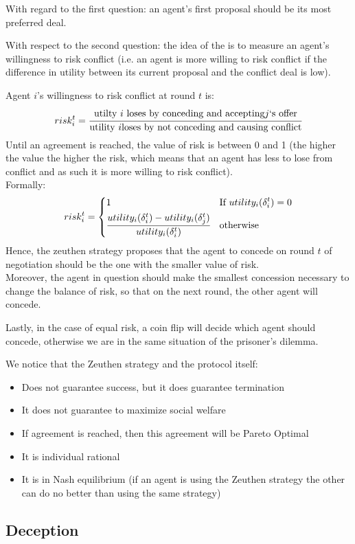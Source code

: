 With regard to the first question: an agent's first proposal should be its most preferred deal.

With respect to the second question: the idea of the  is to measure an agent's willingness to risk conflict (i.e. an agent is more willing to risk conflict if the difference in utility between its current proposal and the conflict deal is low).

Agent $i$'s willingness to risk conflict at round $t$ is:
\[risk^t_i = \cfrac{\text{utilty }i\text{ loses by conceding and accepting}j\text{`s offer} }{\text{utility }i\text{loses by not conceding and causing conflict}}\]
Until an agreement is reached, the value of risk is between 0 and 1 (the higher the value the higher the risk, which means that an agent has less to lose from conflict and as such it is more willing to risk conflict).\\
Formally:
\[risk^t_i =
\begin{dcases}
1 & \text{If }utility_i(\delta_i^t)=0\\
\cfrac{utility_i(\delta_i^t) - utility_i(\delta_j^t)}{utility_i(\delta_i^t)} &\text{otherwise}
\end{dcases}
\]
Hence, the zeuthen strategy proposes that the agent to concede on round $t$ of negotiation should be the one with the smaller value of risk.\\
Moreover, the agent in question should make the smallest concession necessary to change the balance of risk, so that on the next round, the other agent will concede.

Lastly, in the case of equal risk, a coin flip will decide which agent should concede, otherwise we are in the same situation of the prisoner's dilemma.

We notice that the Zeuthen strategy and the protocol itself:
\begin{itemize}
\item Does not guarantee success, but it does guarantee termination
\item It does not guarantee to maximize social welfare
\item If agreement is reached, then this agreement will be Pareto Optimal
\item It is individual rational
\item It is in Nash equilibrium (if an agent is using the Zeuthen strategy the other can do no better than using the same strategy)
\end{itemize}
\subsection{Deception}